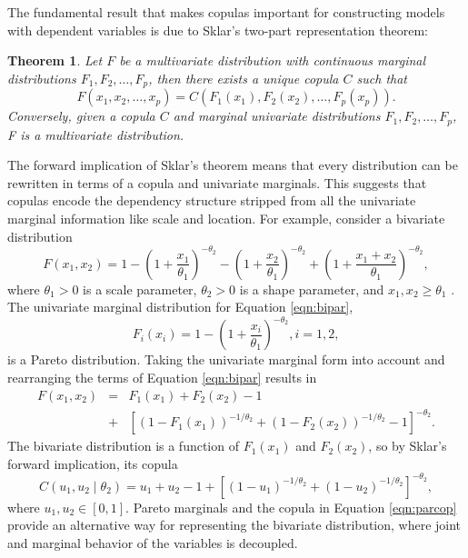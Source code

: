 \documentclass[12pt]{article}
\begin{document}
The fundamental result that makes copulas important for constructing models with dependent variables is due to Sklar's \citeyear{Skl1959} two-part representation theorem:
%
\newtheorem*{Sklar}{Theorem} 
\begin{Sklar} 
Let $F$ be a multivariate distribution with continuous marginal
distributions $F_1, F_2, \dots, F_p$, then there exists a unique
copula $C$ such that 
\begin{equation}
\label{eqn:sklar}
F(x_1, x_2, \dots, x_p) = C(F_1(x_1), F_2(x_2),
\dots, F_p(x_p)).
\end{equation}Conversely, given a copula $C$ and marginal
univariate distributions $F_1, F_2, \dots, F_p$, F is a
multivariate distribution.  
\end{Sklar}

The forward implication of Sklar's theorem means that every distribution
can be rewritten in terms of a copula and univariate marginals. This
suggests that copulas encode the dependency structure stripped from
all the univariate marginal information like scale and
location. For example, consider a bivariate distribution
\begin{equation}
\label{eqn:bipar}
F(x_1, x_2) = 1 - \left(1 + \frac{x_1}{\theta_1} \right)^{-\theta_2} -\left(1 + \frac{x_2}{\theta_1} \right)^{-\theta_2} +\left(1 + \frac{x_1 + x_2}{\theta_1} \right)^{-\theta_2},
\end{equation}
where $\theta_1 > 0$ is a scale parameter, $\theta_2 > 0$ is a shape parameter, and $x_1, x_2 \geq \theta_1$
\citep{FreVal1998}. The univariate marginal distribution for Equation \ref{eqn:bipar},
\begin{equation}
F_i(x_i) = 1 - \left(1 + \frac{x_i}{\theta_1}\right)^{-\theta_2}, i = 1, 2,
\end{equation}
is a Pareto distribution. Taking the univariate marginal form into account and rearranging the terms of Equation \ref{eqn:bipar} results in
\begin{eqnarray}
F(x_1, x_2) & = & F_1(x_1) + F_2(x_2) - 1 \\ \nonumber
& + & \left[(1 - F_1(x_1))^{-1/\theta_2} + (1 - F_2(x_2))^{-1/\theta_2} - 1 \right]^{-\theta_2}.
\end{eqnarray}
The bivariate distribution is a function of $F_1(x_1)$ and $F_2(x_2)$, so by Sklar's forward implication, its copula
\begin{equation}
\label{eqn:parcop}
C(u_1, u_2 \mid \theta_2) = u_1 + u_2 - 1 + [(1 - u_1)^{-1/\theta_2} + (1 - u_2)^{-1/\theta_2}]^{-\theta_2},
\end{equation}
where $u_1, u_2 \in [0, 1]$. Pareto marginals and the copula in Equation \ref{eqn:parcop} provide an alternative way for representing the bivariate distribution, where joint and marginal behavior of the variables is decoupled.
\end{document}
